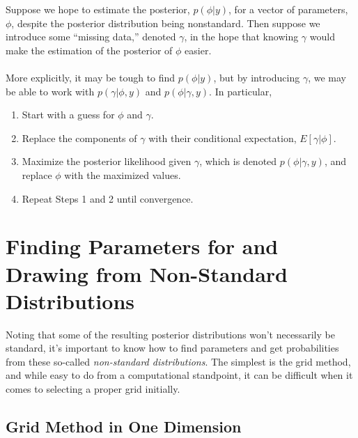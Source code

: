 \documentclass[12pt]{article}
\begin{document}
Suppose we hope to estimate the posterior, $p(\phi|y)$, for
a vector of parameters, $\phi$,
despite the posterior distribution being nonstandard. Then suppose
we introduce some ``missing data,'' denoted $\gamma$, in the hope that
knowing $\gamma$ would make the estimation of the posterior of
$\phi$ easier. 
\\
\\
More explicitly, it may be tough to find $p(\phi|y)$, but by introducing
$\gamma$, we may be able to work with $p(\gamma|\phi,y)$ and 
$p(\phi|\gamma,y)$. In particular, 
\begin{enumerate}
   \item Start with a guess for $\phi$ and $\gamma$.
   \item Replace the components of $\gamma$ with
      their conditional expectation, $E[\gamma | \phi]$.
   \item Maximize the posterior
      likelihood given $\gamma$, which is denoted $p(\phi|\gamma,y)$,
      and replace $\phi$ with the maximized values.
   \item Repeat Steps 1 and 2 until convergence. 
\end{enumerate}




\newpage


\appendix

\newpage
\section{Finding Parameters for and 
Drawing from Non-Standard Distributions}

Noting that some of the resulting posterior distributions won't 
necessarily be standard, it's important to know how to find parameters
and get probabilities
from these so-called \emph{non-standard distributions}. The simplest
is the grid method, and while easy to do from a computational 
standpoint,
it can be difficult when it comes to selecting a proper grid
initially.

\subsection{Grid Method in One Dimension}
\end{document}
